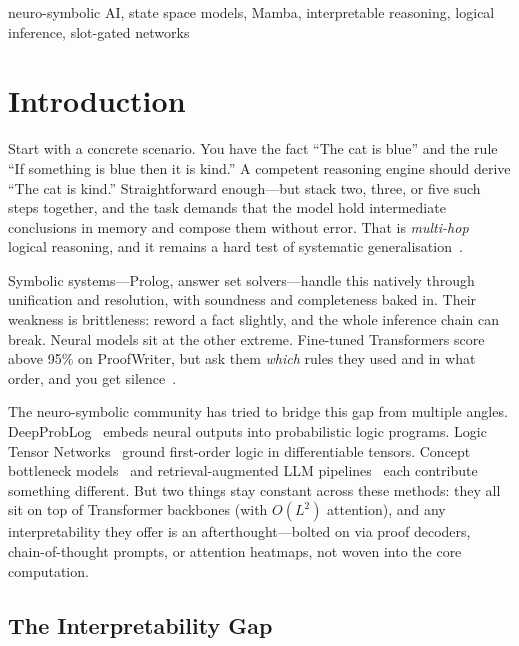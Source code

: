 \documentclass[conference]{IEEEtran}
\begin{document}
\begin{IEEEkeywords}
neuro-symbolic AI, state space models, Mamba, interpretable
reasoning, logical inference, slot-gated networks
\end{IEEEkeywords}

\section{Introduction}
\label{sec:intro}

Start with a concrete scenario. You have the fact ``The cat is blue''
and the rule ``If something is blue then it is kind.'' A competent
reasoning engine should derive ``The cat is kind.'' Straightforward
enough---but stack two, three, or five such steps together, and the
task demands that the model hold intermediate conclusions in memory and
compose them without error. That is \emph{multi-hop} logical reasoning,
and it remains a hard test of systematic
generalisation~\cite{clark2020ruletaker}.

Symbolic systems---Prolog, answer set solvers---handle this natively
through unification and resolution, with soundness and completeness
baked in. Their weakness is brittleness: reword a fact slightly, and
the whole inference chain can break. Neural models sit at the other
extreme. Fine-tuned Transformers score above 95\% on ProofWriter, but
ask them \emph{which} rules they used and in what order, and you get
silence~\cite{tafjord2021proofwriter}.

The neuro-symbolic community has tried to bridge this gap from multiple
angles. DeepProbLog~\cite{manhaeve2018deepproblog} embeds neural outputs
into probabilistic logic programs.  Logic Tensor
Networks~\cite{badreddine2022ltn} ground first-order logic in
differentiable tensors.  Concept bottleneck
models~\cite{koh2020cbm} and retrieval-augmented LLM
pipelines~\cite{kazemi2023lambada} each contribute something
different. But two things stay constant across these methods: they all
sit on top of Transformer backbones (with $O(L^2)$ attention), and any
interpretability they offer is an afterthought---bolted on via proof
decoders, chain-of-thought prompts, or attention heatmaps, not woven
into the core computation.

\subsection{The Interpretability Gap}
\end{document}
